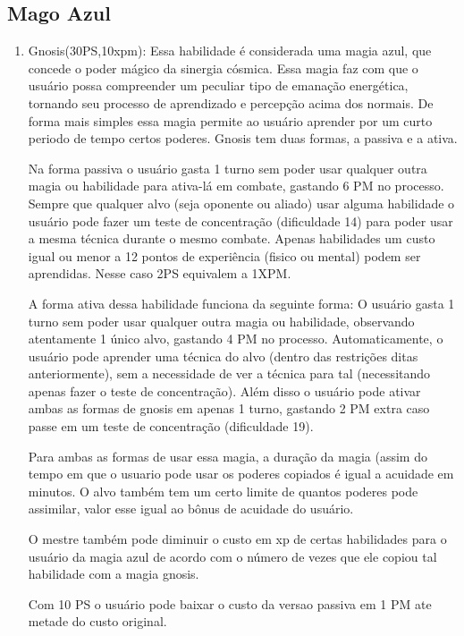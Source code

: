 \subsection{Mago Azul} 
 
 		
\begin{enumerate}

	\item Gnosis(30PS,10xpm): Essa habilidade é considerada uma magia azul, que concede o poder mágico da sinergia cósmica. Essa magia faz com que o usuário possa compreender um peculiar tipo de emanação energética, tornando seu processo de aprendizado e percepção acima dos normais. De forma mais simples essa magia permite ao usuário aprender por um curto periodo de tempo certos poderes. Gnosis tem duas formas, a passiva e a ativa. 
	
	Na forma passiva o usuário gasta 1 turno sem poder usar qualquer outra magia ou habilidade para ativa-lá em combate, gastando 6 PM no processo. Sempre que qualquer alvo (seja oponente ou aliado) usar alguma habilidade o usuário pode fazer um teste de concentração (dificuldade 14) para poder usar a mesma técnica durante o mesmo combate. Apenas habilidades um custo igual ou menor a 12 pontos de experiência (fisico ou mental) podem ser aprendidas. Nesse caso 2PS equivalem a 1XPM.
	
    A forma ativa dessa habilidade funciona da seguinte forma: O usuário gasta 1 turno sem poder usar qualquer outra magia ou habilidade, observando atentamente 1 único alvo, gastando 4 PM no processo. Automaticamente, o usuário pode aprender uma técnica do alvo (dentro das restrições ditas anteriormente), sem a necessidade de ver a técnica para tal (necessitando apenas fazer o teste de concentração). Além disso o usuário pode ativar ambas as formas de gnosis em apenas 1 turno, gastando 2 PM extra caso passe em um teste de concentração (dificuldade 19). 
    
    Para ambas as formas de usar essa magia, a duração da magia (assim do tempo em que o usuario pode usar os poderes copiados é igual a acuidade em minutos. O alvo também tem um certo limite de quantos poderes pode assimilar, valor esse igual ao bônus de acuidade do usuário. 
    
    O mestre também pode diminuir o custo em xp de certas habilidades para o usuário da magia azul de acordo com o número de vezes que ele copiou tal habilidade com a magia gnosis. 
    
    Com 10 PS o usuário pode baixar o custo da versao passiva em 1 PM ate metade do custo original. 


\end{enumerate}
